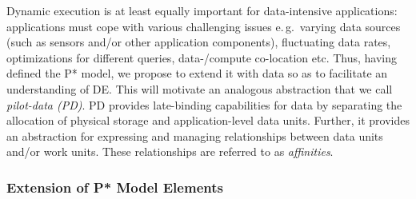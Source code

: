 \documentclass[conference,final]{IEEEtran}
\newcommand{\jhanote}[1]{ {\textcolor{red} { ***shantenu: #1 }}}
\newcommand{\alnote}[1]{ {\textcolor{blue} { ***andre: #1 }}}
\newcommand{\alnote}[1]{}
\newcommand{\jhanote}[1]{}
\begin{document}


Dynamic execution is at least equally important for data-intensive
applications: applications must cope with various challenging issues
e.\,g.\ varying data sources (such as sensors and/or other application
components), fluctuating data rates, optimizations for different
queries, data-/compute co-location etc. Thus, having defined the P*
model, we propose to extend it with data so as to facilitate an
understanding of DE. This will motivate an analogous abstraction that
we call \emph{pilot-data (PD)}. PD provides late-binding
capabilities for data by separating the allocation of
physical storage and application-level data units. Further, it
provides an abstraction for expressing and managing relationships
between data units and/or work units. These relationships are
referred to as \emph{affinities}.  %

\subsubsection*{Extension of P* Model Elements}

\end{document}
